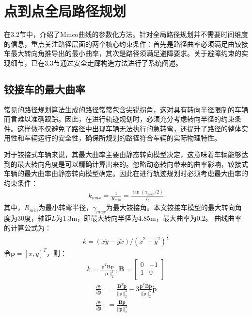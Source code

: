 \documentclass[master,academic]{ysuthesis} %
\begin{document}
	\section{点到点全局路径规划}
	在3.2节中，介绍了Minco曲线的参数化方法。针对全局路径规划并不需要时间维度的信息，重点关注路径层面的两个核心约束条件：首先是路径曲率必须满足由铰接车最大转向角推导出的最小曲率，其次是路径须满足避障要求。关于避障约束的实现细节，已在3.3节通过安全走廊构造方法进行了系统阐述。
		\subsection{铰接车的最大曲率}
		常见的路径规划算法生成的路径常常包含尖锐拐角，这对具有转向半径限制的车辆而言难以准确跟踪。因此，在进行轨迹规划时，必须充分考虑转向半径的约束条件。这样做不仅避免了路径中出现车辆无法执行的急转弯，还提升了路径的整体实用性和车辆运行的安全性，确保所规划的路径符合车辆的实际物理特性。

		对于铰接式车辆来说，其最大曲率主要由静态转向模型决定，这意味着车辆能够达到的最大转向角度是可以精确计算出来的。忽略动态转向带来的曲率影响，铰接式车辆的最大曲率由静态转向模型确定。因此在进行轨迹规划时必须考虑最大曲率的约束条件：
		\begin{equation}
			\begin{aligned}
				k_{max}=\frac{1}{R_{min}}=\frac{\tan( \gamma _{max}/2 )}{L}
			\end{aligned}
		\end{equation}
		其中，$R_{min}$为最小转弯半径，$\gamma_{max}$为最大铰接角。本文铰接车模型的最大转向角度为30度，轴距$L$为1.3m，即最大转向半径为4.85m，最大曲率为0.2。
		曲线曲率的计算公式为：
		\begin{equation}
			\begin{aligned}
				k=( \dot{x}\ddot{y}-\dot{y}\ddot{x} ) /( \dot{x}^2+\dot{y}^2 ) ^{\frac{3}{2}}
			\end{aligned}
		\end{equation}
		令$\bm{p} =[x,y]^T$，则：
		\begin{equation}
			\begin{aligned}
				k=\frac{\ddot{\bm{p}}^T\bm{B}\dot{\bm{p}}}{\lVert \bm{p} \rVert _{2}^{3}},\bm{B}=\left[ \begin{matrix}
					0&		-1\\
					1&		0\\
				\end{matrix} \right]
			\end{aligned}
			\label{eq:曲线曲率k}
		\end{equation}
		\begin{equation}
			\begin{aligned}
				\frac{\partial k}{\partial \dot{\bm{p}}}&=\frac{\bm{B}^T\ddot{\bm{p}}}{||\dot{\bm{p}}||_{2}^{3}}-3\frac{\ddot{\bm{p}}^T\bm{B}\dot{\bm{p}}}{||\dot{\bm{p}}||_{2}^{5}}\dot{\bm{p}}\\
				\frac{\partial k}{\partial \ddot{\bm{p}}}&=\frac{\bm{B}\dot{\bm{p}}}{||\dot{\bm{p}}||_{2}^{3}}
			\end{aligned}
		\end{equation}
\end{document}
